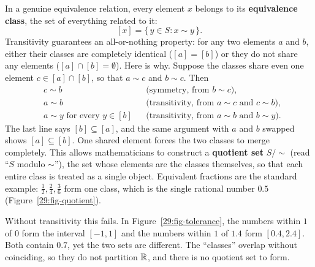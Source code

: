 \begin{example}
In a genuine equivalence relation, every element $x$ belongs to its \textbf{equivalence class}, the set of everything related to it:
\[
[x] = \{\, y \in S : x \sim y \,\}.
\]
Transitivity guarantees an all-or-nothing property: for any two elements $a$ and $b$, either their classes are completely identical ($[a] = [b]$) or they do not share any elements ($[a] \cap [b] = \emptyset$). Here is why. Suppose the classes share even one element $c \in [a] \cap [b]$, so that $a \sim c$ and $b \sim c$. Then
\begin{align*}
&c \sim b && \text{(symmetry, from $b \sim c$)},\\
&a \sim b && \text{(transitivity, from $a \sim c$ and $c \sim b$)},\\
&a \sim y \text{ for every } y \in [b] && \text{(transitivity, from $a \sim b$ and $b \sim y$)}.
\end{align*}
The last line says $[b] \subseteq [a]$, and the same argument with $a$ and $b$ swapped shows $[a] \subseteq [b]$. One shared element forces the two classes to merge completely. This allows mathematicians to construct a \textbf{quotient set} $S/{\sim}$ (read ``$S$ modulo $\sim$''), the set whose elements are the classes themselves, so that each entire class is treated as a single object. Equivalent fractions are the standard example: $\frac{1}{2}, \frac{2}{4}, \frac{3}{6}$ form one class, which is the single rational number $0.5$ (Figure~\ref{29:fig-quotient}).

Without transitivity this fails. In Figure~\ref{29:fig-tolerance}, the numbers within $1$ of $0$ form the interval $[-1, 1]$ and the numbers within $1$ of $1.4$ form $[0.4, 2.4]$. Both contain $0.7$, yet the two sets are different. The ``classes'' overlap without coinciding, so they do not partition $\mathbb{R}$, and there is no quotient set to form.
\end{example}

